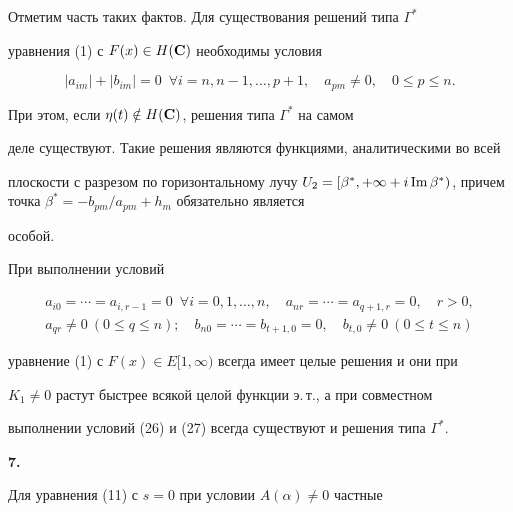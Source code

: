 {Отметим часть таких фактов. Для существования решений типа $\Gamma^*$


уравнения (1) с $F(x)\in H(\bold C)$ необходимы условия


\begin{equation}


|a_{im}|+|b_{im}|=0\ \; \forall i=n,n-1,\dotsc,p+1, \quad a_{pm}\ne 0,\quad


0\le p \le n.


\end{equation}


При этом, если $\eta(t)\notin H(\bold C)$, решения типа $\Gamma^*$ на самом


деле существуют. Такие решения являются функциями, аналитическими во всей


плоскости с разрезом по горизонтальному лучу $U_2=[\beta^*,+\infty+i\Imm


\beta^*)$, причем точка $\beta^*=-b_{pm}/a_{pm}+h_m$ обязательно является


особой.





При выполнении условий


\begin{equation}


\begin{array}{c}


a_{i0}=\dotsb=a_{i,r-1}=0\ \; \forall i=0,1,\dotsc,n, \quad


a_{nr}=\dotsb=a_{q+1,r}=0, \quad r>0,\\


a_{qr}\ne 0\  (0\le q\le n); \quad b_{n0}=\dotsb=b_{t+1,0}=0,


\quad b_{t,0}\ne 0 \ (0\le t \le n)


\end{array}


\end{equation}


уравнение (1) с $F(x)\in E[1,\infty)$ всегда имеет целые решения и они при


$K_1\ne 0$ растут быстрее всякой целой функции э.\,т., а при совместном


выполнении условий (26) и (27) всегда существуют и решения типа $\Gamma^*$.


\medskip





{\bf 7.}


Для уравнения (11) с $s=0$ при условии $A(\alpha)\ne 0$ частные


}
